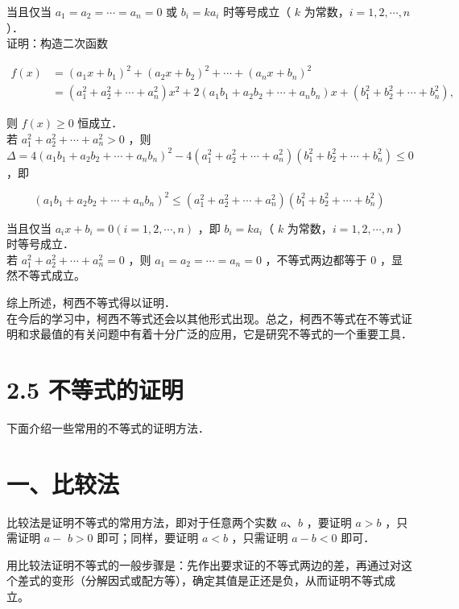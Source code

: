 \documentclass[10pt]{article}
\begin{document}
当且仅当 \(a_{1}=a_{2}=\cdots=a_{n}=0\) 或 \(b_{i}=k a_{i}\) 时等号成立（ \(k\) 为常数，\(i=1,2, \cdots, n\) ）．\\
证明：构造二次函数

\[
\begin{aligned}
f(x) & =\left(a_{1} x+b_{1}\right)^{2}+\left(a_{2} x+b_{2}\right)^{2}+\cdots+\left(a_{n} x+b_{n}\right)^{2} \\
& =\left(a_{1}^{2}+a_{2}^{2}+\cdots+a_{n}^{2}\right) x^{2}+2\left(a_{1} b_{1}+a_{2} b_{2}+\cdots+a_{n} b_{n}\right) x+\left(b_{1}^{2}+b_{2}^{2}+\cdots+b_{n}^{2}\right),
\end{aligned}
\]

则 \(f(x) \geqslant 0\) 恒成立．\\
若 \(a_{1}^{2}+a_{2}^{2}+\cdots+a_{n}^{2}>0\) ，则\\
\(\Delta=4\left(a_{1} b_{1}+a_{2} b_{2}+\cdots+a_{n} b_{n}\right)^{2}-4\left(a_{1}^{2}+a_{2}^{2}+\cdots+a_{n}^{2}\right)\left(b_{1}^{2}+b_{2}^{2}+\cdots+b_{n}^{2}\right) \leqslant 0\) ，即

\[
\left(a_{1} b_{1}+a_{2} b_{2}+\cdots+a_{n} b_{n}\right)^{2} \leqslant\left(a_{1}^{2}+a_{2}^{2}+\cdots+a_{n}^{2}\right)\left(b_{1}^{2}+b_{2}^{2}+\cdots+b_{n}^{2}\right)
\]

当且仅当 \(a_{i} x+b_{i}=0(i=1,2, \cdots, n)\) ，即 \(b_{i}=k a_{i}\)（ \(k\) 为常数，\(i=1,2, \cdots, n\) ）时等号成立．\\
若 \(a_{1}^{2}+a_{2}^{2}+\cdots+a_{n}^{2}=0\) ，则 \(a_{1}=a_{2}=\cdots=a_{n}=0\) ，不等式两边都等于 0 ，显然不等式成立。

综上所述，柯西不等式得以证明．\\
在今后的学习中，柯西不等式还会以其他形式出现。总之，柯西不等式在不等式证明和求最值的有关问题中有着十分广泛的应用，它是研究不等式的一个重要工具．

\section*{2.5 不等式的证明}
下面介绍一些常用的不等式的证明方法．

\section*{一、比较法}
比较法是证明不等式的常用方法，即对于任意两个实数 \(a 、 b\) ，要证明 \(a>b\) ，只需证明 \(a-\) \(b>0\) 即可；同样，要证明 \(a<b\) ，只需证明 \(a-b<0\) 即可．

用比较法证明不等式的一般步骤是：先作出要求证的不等式两边的差，再通过对这个差式的变形（分解因式或配方等），确定其值是正还是负，从而证明不等式成立。
\end{document}
